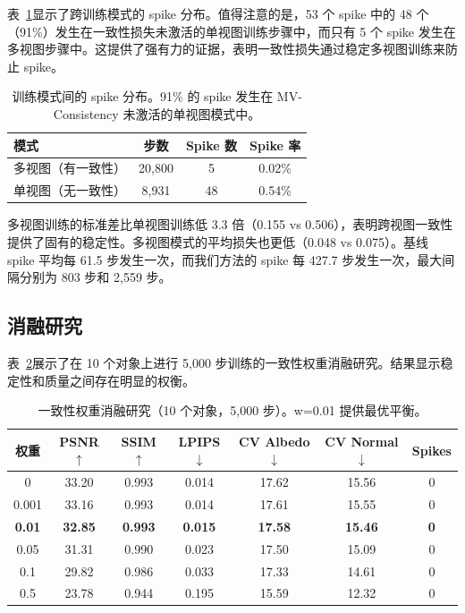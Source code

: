 \documentclass{article}
\begin{document}
表~\ref{tab:gradient}显示了跨训练模式的 spike 分布。值得注意的是，53 个 spike 中的 48 个（91\%）发生在一致性损失未激活的单视图训练步骤中，而只有 5 个 spike 发生在多视图步骤中。这提供了强有力的证据，表明一致性损失通过稳定多视图训练来防止 spike。

\begin{table}[h]
\centering
\caption{训练模式间的 spike 分布。91\% 的 spike 发生在 MV-Consistency 未激活的单视图模式中。}
\label{tab:gradient}
\begin{tabular}{lccc}
\toprule
模式 & 步数 & Spike 数 & Spike 率 \\
\midrule
多视图（有一致性） & 20,800 & 5 & 0.02\% \\
单视图（无一致性） & 8,931 & 48 & 0.54\% \\
\bottomrule
\end{tabular}
\end{table}

多视图训练的标准差比单视图训练低 3.3 倍（0.155 vs 0.506），表明跨视图一致性提供了固有的稳定性。多视图模式的平均损失也更低（0.048 vs 0.075）。基线 spike 平均每 61.5 步发生一次，而我们方法的 spike 每 427.7 步发生一次，最大间隔分别为 803 步和 2,559 步。

\subsection{消融研究}

表~\ref{tab:ablation}展示了在 10 个对象上进行 5,000 步训练的一致性权重消融研究。结果显示稳定性和质量之间存在明显的权衡。

\begin{table}[h]
\centering
\caption{一致性权重消融研究（10 个对象，5,000 步）。w=0.01 提供最优平衡。}
\label{tab:ablation}
\begin{tabular}{ccccccc}
\toprule
权重 & PSNR$\uparrow$ & SSIM$\uparrow$ & LPIPS$\downarrow$ & CV Albedo$\downarrow$ & CV Normal$\downarrow$ & Spikes \\
\midrule
0 & 33.20 & 0.993 & 0.014 & 17.62 & 15.56 & 0 \\
0.001 & 33.16 & 0.993 & 0.014 & 17.61 & 15.55 & 0 \\
\textbf{0.01} & \textbf{32.85} & \textbf{0.993} & \textbf{0.015} & \textbf{17.58} & \textbf{15.46} & \textbf{0} \\
0.05 & 31.31 & 0.990 & 0.023 & 17.50 & 15.09 & 0 \\
0.1 & 29.82 & 0.986 & 0.033 & 17.33 & 14.61 & 0 \\
0.5 & 23.78 & 0.944 & 0.195 & 15.59 & 12.32 & 0 \\
\bottomrule
\end{tabular}
\end{table}
\end{document}
